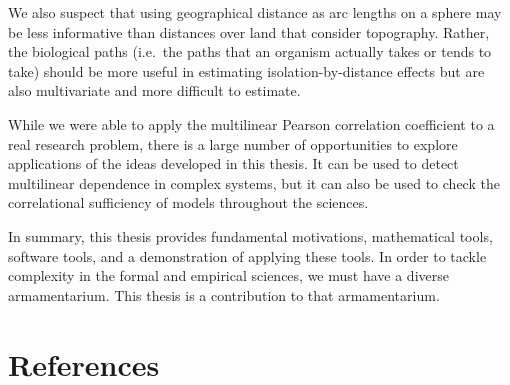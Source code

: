 \documentclass[
  letterpaper,
  DIV=11,
  numbers=noendperiod]{scrreprt}
\begin{document}
We also suspect that using geographical distance as arc lengths on a
sphere may be less informative than distances over land that consider
topography. Rather, the biological paths (i.e.~the paths that an
organism actually takes or tends to take) should be more useful in
estimating isolation-by-distance effects but are also multivariate and
more difficult to estimate.

While we were able to apply the multilinear Pearson correlation
coefficient to a real research problem, there is a large number of
opportunities to explore applications of the ideas developed in this
thesis. It can be used to detect multilinear dependence in complex
systems, but it can also be used to check the correlational sufficiency
of models throughout the sciences.

In summary, this thesis provides fundamental motivations, mathematical
tools, software tools, and a demonstration of applying these tools. In
order to tackle complexity in the formal and empirical sciences, we must
have a diverse armamentarium. This thesis is a contribution to that
armamentarium.


\chapter*{References}\label{references}

\end{document}
